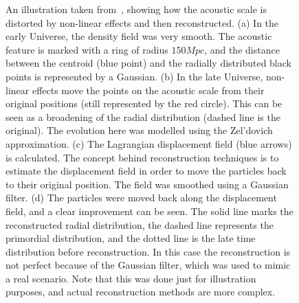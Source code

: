 \begin{figure}
    \caption{
    An illustration taken from~\cite{2012MNRAS.427.2132P}, showing how the acoustic scale is distorted by non-linear effects and then reconstructed. (a) In the early Universe, the density field was very smooth. The acoustic feature is marked with a ring of radius $150Mpc$, and the distance between the centroid (blue point) and the radially distributed black points is represented by a Gaussian. (b) In the late Universe, non-linear effects move the points on the acoustic scale from their original positions (still represented by the red circle). This can be seen as a broadening of the radial distribution (dashed line is the original). The evolution here was modelled using the Zel'dovich approximation. (c) The Lagrangian displacement field (blue arrows) is calculated. The concept behind reconstruction techniques is to estimate the displacement field in order to move the particles back to their original position. The field was smoothed using a Gaussian filter. (d) The particles were moved back along the displacement field, and a clear improvement can be seen. The solid line marks the reconstructed radial distribution, the dashed line represents the primordial distribution, and the dotted line is the late time distribution before reconstruction. In this case the reconstruction is not perfect because of the Gaussian filter, which was used to mimic a real scenario. Note that this was done just for illustration purposes, and actual reconstruction methods are more complex.
    }
    
\label{fig:3}
\end{figure}



